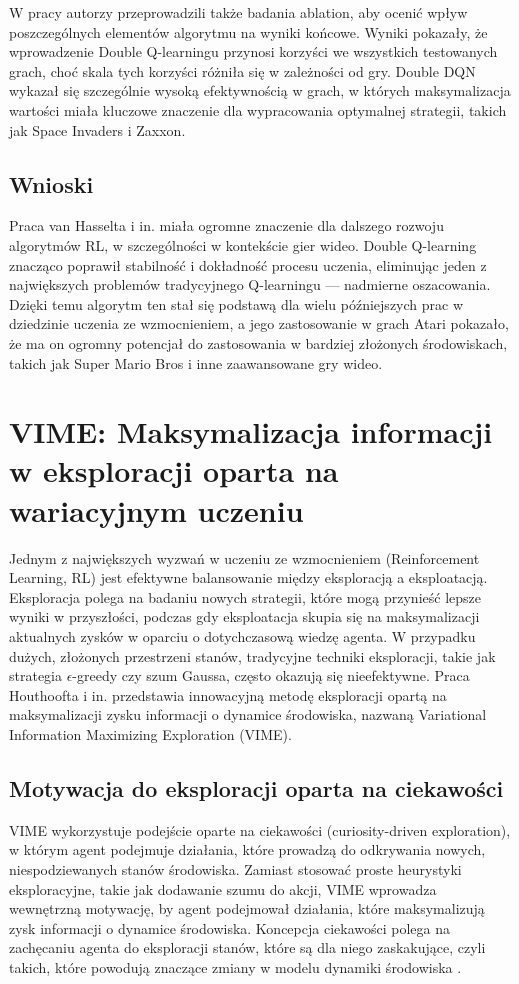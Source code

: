W pracy \cite{DQ} autorzy przeprowadzili także badania ablation, aby ocenić wpływ poszczególnych elementów algorytmu na wyniki końcowe. Wyniki pokazały, że wprowadzenie Double Q-learningu przynosi korzyści we wszystkich testowanych grach, choć skala tych korzyści różniła się w zależności od gry. Double DQN wykazał się szczególnie wysoką efektywnością w grach, w których maksymalizacja wartości miała kluczowe znaczenie dla wypracowania optymalnej strategii, takich jak Space Invaders i Zaxxon.

\subsection{Wnioski}
Praca van Hasselta i in. \cite{DQ} miała ogromne znaczenie dla dalszego rozwoju algorytmów RL, w szczególności w kontekście gier wideo. Double Q-learning znacząco poprawił stabilność i dokładność procesu uczenia, eliminując jeden z największych problemów tradycyjnego Q-learningu — nadmierne oszacowania. Dzięki temu algorytm ten stał się podstawą dla wielu późniejszych prac w dziedzinie uczenia ze wzmocnieniem, a jego zastosowanie w grach Atari pokazało, że ma on ogromny potencjał do zastosowania w bardziej złożonych środowiskach, takich jak Super Mario Bros i inne zaawansowane gry wideo.

\section{VIME: Maksymalizacja informacji w eksploracji oparta na wariacyjnym uczeniu}

Jednym z największych wyzwań w uczeniu ze wzmocnieniem (Reinforcement Learning, RL) jest efektywne balansowanie między eksploracją a eksploatacją. Eksploracja polega na badaniu nowych strategii, które mogą przynieść lepsze wyniki w przyszłości, podczas gdy eksploatacja skupia się na maksymalizacji aktualnych zysków w oparciu o dotychczasową wiedzę agenta. W przypadku dużych, złożonych przestrzeni stanów, tradycyjne techniki eksploracji, takie jak strategia $\epsilon$-greedy czy szum Gaussa, często okazują się nieefektywne. Praca Houthoofta i in. \cite{VIME} przedstawia innowacyjną metodę eksploracji opartą na maksymalizacji zysku informacji o dynamice środowiska, nazwaną Variational Information Maximizing Exploration (VIME).

\subsection{Motywacja do eksploracji oparta na ciekawości}
VIME wykorzystuje podejście oparte na ciekawości (curiosity-driven exploration), w którym agent podejmuje działania, które prowadzą do odkrywania nowych, niespodziewanych stanów środowiska. Zamiast stosować proste heurystyki eksploracyjne, takie jak dodawanie szumu do akcji, VIME wprowadza wewnętrzną motywację, by agent podejmował działania, które maksymalizują zysk informacji o dynamice środowiska. Koncepcja ciekawości polega na zachęcaniu agenta do eksploracji stanów, które są dla niego zaskakujące, czyli takich, które powodują znaczące zmiany w modelu dynamiki środowiska \cite{VIME}.

